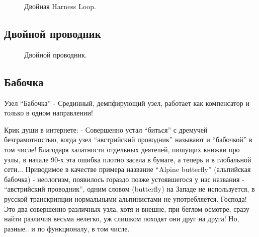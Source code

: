 \begin{figure}[H]\centering
	\subfloat[Результат]{\label{ris:Double_Harness_Loop_2}
	\tcbox[enhanced jigsaw,colframe=black,opacityframe=0.5,opacityback=0.5]
		{\centering
			}
		}
	\caption{Двойная Harness Loop.}\label{ris:Double_Harness_Loop}
\end{figure}

\subsection{Двойной проводник}

\begin{figure}[H]\centering
	\subfloat[Завязывание]{\label{ris:Double_provodnik_1}
	\tcbox[enhanced jigsaw,colframe=black,opacityframe=0.5,opacityback=0.5]
		{\centering
			}
		}
\end{figure}

\begin{figure}[H]\centering
	\subfloat[Завязывание]{\label{ris:Double_provodnik_2}
	\tcbox[enhanced jigsaw,colframe=black,opacityframe=0.5,opacityback=0.5]
		{\centering
			}
		}
\end{figure}

\begin{figure}[H]\centering
	\subfloat[Результат]{\label{ris:Double_provodnik_3}
	\tcbox[enhanced jigsaw,colframe=black,opacityframe=0.5,opacityback=0.5]
		{\centering
			}
		}
	\caption{Двойной проводник.}\label{ris:Double_provodnik}
\end{figure}

\subsection{Бабочка}


Узел \enquote{Бабочка} - Срединный, демпфирующий узел, работает как компенсатор и только в одном направлении!

Крик души в интернете:
- Совершенно устал “биться” с дремучей безграмотностью, когда узел “австрийский проводник” называют и “бабочкой” в том числе! Благодаря халатности отдельных деятелей, пишущих книжки про узлы, в начале 90-х эта ошибка плотно засела в бумаге, а теперь и в глобальной сети... Приводимое в качестве примера название “Alpine butterfly” (альпийская бабочка) - неологизм, появилось гораздо позже устоявшегося у нас названия - “австрийский проводник”, одним словом (butterfly) на Западе не используется, в русской транскрипции нормальными альпинистами не употребляется. Господа! Это два совершенно различных узла, хотя и внешне, при беглом осмотре, сразу найти различия весьма нелегко, уж слишком походят они друг на друга! Но, разные.. и по функционалу, в том числе.

